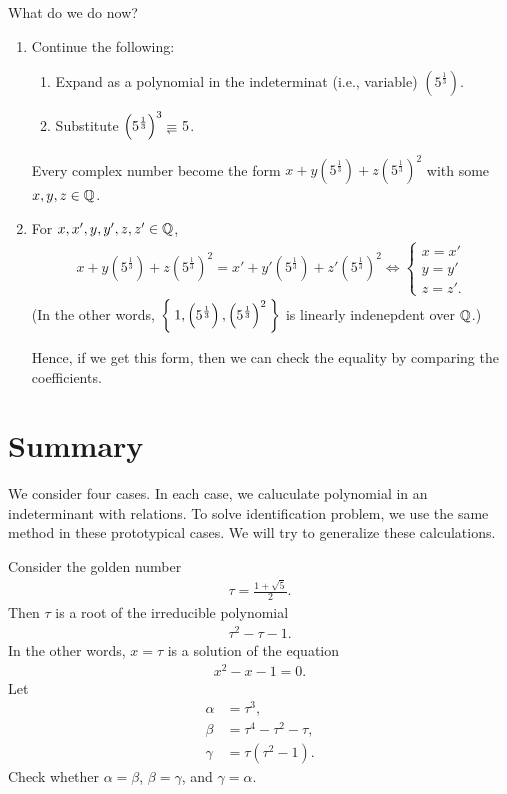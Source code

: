 What do we do now?
\begin{enumerate}
\item Continue the following:
  \begin{enumerate}
  \item Expand as a polynomial in the indeterminat (i.e., variable) $\left(5^{\frac{1}{3}}\right)$.
  \item Substitute $\left(5^{\frac{1}{3}}\right)^3\denotes 5$.
  \end{enumerate}
  Every complex number become the form $x+y\left(5^{\frac{1}{3}}\right)+z\left(5^{\frac{1}{3}}\right)^2$
  with some $x,y,z\in\mathbb{Q}$.
\item For $x,x',y,y',z,z'\in\mathbb{Q}$,
  \begin{align*}
      x+y\left(5^{\frac{1}{3}}\right)+z\left(5^{\frac{1}{3}}\right)^2=x'+y'\left(5^{\frac{1}{3}}\right) +z'\left(5^{\frac{1}{3}}\right)^2\iff \begin{cases}x=x'\\y=y'\\z=z'.\end{cases}
  \end{align*}
  (In the other words,
  $\Set{1,\left(5^{\frac{1}{3}}\right),\left(5^{\frac{1}{3}}\right)^2}$ is linearly indenepdent over $\mathbb{Q}$.)

  Hence, if we get this form, then we can check the equality by
  comparing the coefficients.
\end{enumerate}


\section{Summary}
We consider four cases.
In each case,
we caluculate polynomial in an indeterminant with relations.
To solve identification problem,
we use the same method in these prototypical cases.
We will try to generalize these calculations.

\begin{quiz}
  Consider the golden number
  \begin{align*}
    \tau = \frac{1+\sqrt{5}}{2}.
  \end{align*}
  Then $\tau$ is a root of the irreducible polynomial
  \begin{align*}
    \tau^2-\tau-1.
  \end{align*}
  In the other words, $x=\tau$ is a solution of the equation
  \begin{align*}
    x^2-x-1=0.
  \end{align*}
  Let
  \begin{align*}
  \alpha &= \tau^3,\\
  \beta &= \tau^4-\tau^2-\tau,\\
  \gamma &= \tau(\tau^2-1).
  \end{align*}
Check whether $\alpha=\beta$, $\beta=\gamma$,
and $\gamma=\alpha$.
\end{quiz}

